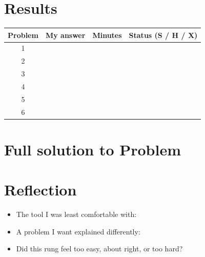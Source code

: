 \documentclass[11pt]{article}
\begin{document}

\section*{Results}
\begin{center}
\begin{tabular}{c|c|c|c}
Problem & My answer & Minutes & Status (S / H / X) \\
\hline
1 & & & \\
2 & & & \\
3 & & & \\
4 & & & \\
5 & & & \\
6 & & & \\
\end{tabular}
\end{center}

\section*{Full solution to Problem \blank[1cm]}

\begin{answer}
\end{answer}


\section*{Reflection}
\begin{itemize}
  \item The tool I was least comfortable with:
  \item A problem I want explained differently:
  \item Did this rung feel too easy, about right, or too hard?
\end{itemize}
\end{document}
